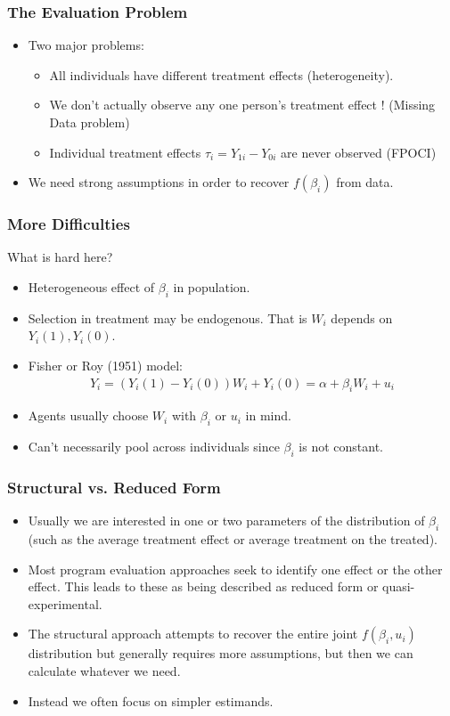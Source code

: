\begin{frame}
  \frametitle{The Evaluation Problem}
  \begin{itemize}
  \item Two major problems:
  \begin{itemize}
  \item All individuals have different treatment effects (\alert{heterogeneity}).
  \item We don't actually observe any one person's treatment effect ! (Missing Data problem)
  \item Individual treatment effects $\tau_i = Y_{1i} - Y_{0i}$ are never observed (FPOCI)
  \end{itemize}
  \item We need strong assumptions in order to recover $f(\beta_i)$ from data.
  \end{itemize}
\end{frame}

\begin{frame}
  \frametitle{More Difficulties}
  What is hard here?
  \begin{itemize}
  \item Heterogeneous effect of $\beta_i$ in population.
  \item Selection in treatment may be endogenous. That is $W_i$ depends on $Y_i(1),Y_i(0)$.
  \item Fisher or Roy (1951) model:
  \begin{eqnarray*}
  Y_i = (Y_i(1) - Y_i(0)) W_i + Y_i(0)= \alpha + \beta_i W_i + u_i
  \end{eqnarray*}
  \item Agents usually choose $W_i$ with $\beta_i$ or $u_i$ in mind.
  \item Can't necessarily pool across individuals since $\beta_i$ is not constant.
  \end{itemize}
\end{frame}


\begin{frame}
  \frametitle{Structural vs. Reduced Form}
  \begin{itemize}
  \item Usually we are interested in one or two parameters of the distribution of $\beta_i$ (such as the average treatment effect or average treatment on the treated).
  \item Most program evaluation approaches seek to identify one effect or the other effect. This leads to these as being described as \alert{reduced form} or \alert{quasi-experimental}.
  \item The \alert{structural} approach attempts to recover the entire joint $f(\beta_i,u_i)$ distribution but generally requires more assumptions, but then we can calculate whatever we need.
  \item Instead we often focus on simpler estimands.
  \end{itemize}
\end{frame}

